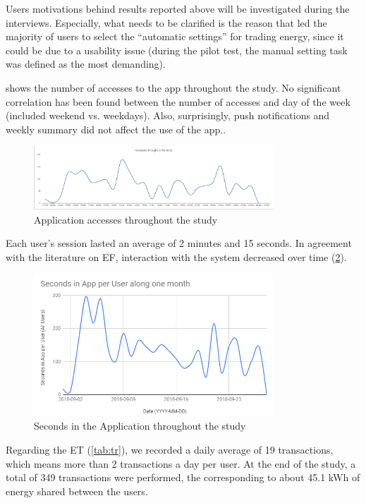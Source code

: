 Users motivations behind results reported above will be investigated during the interviews. Especially, what needs to be clarified is the reason that led the majority of users to select the “automatic settings” for trading energy, since it could be due to a usability issue (during the pilot test, the manual setting task was defined as the most demanding).  

 shows the number of accesses to the app throughout the study. No significant correlation has been found between the number of accesses and day of the week (included weekend vs. weekdays). Also, surprisingly, push notifications and weekly summary did not affect the use of the app.. 


 \begin{figure}[h]
\centering
\includegraphics[width=0.8\textwidth]{./Images/graph2}
\caption{Application accesses throughout the study }
\label{fig:gr2}
\end{figure}

Each user’s session lasted an average of 2 minutes and 15 seconds. In agreement with the literature on EF, interaction with the system decreased over time (\cref{fig:gr3}). 


 \begin{figure}[h]
\centering
\includegraphics[width=0.8\textwidth]{./Images/graph3}
\caption{Seconds in the Application throughout the study}
\label{fig:gr3}
\end{figure}

Regarding the \ac{ET} (\cref{tab:tr}), we recorded a daily average of 19 transactions, which means more than 2 transactions a day per user. 
At the end of the study, a total of 349 transactions were performed, the corresponding to about 45.1 kWh of energy shared between the users. 



